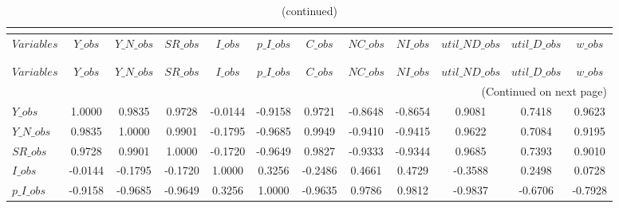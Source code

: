  
\begin{center}
\begin{longtable}{lccccccccccc} 
\caption{MATRIX OF CORRELATIONS}\\
 \label{Table:th_corr_matrix}\\
\toprule 
$Variables      $	 & 	 $          Y\_obs$	 & 	 $      Y\_N\_obs$	 & 	 $         SR\_obs$	 & 	 $          I\_obs$	 & 	 $      p\_I\_obs$	 & 	 $          C\_obs$	 & 	 $         NC\_obs$	 & 	 $         NI\_obs$	 & 	 $  util\_ND\_obs$	 & 	 $   util\_D\_obs$	 & 	 $          w\_obs$\\
\midrule \endfirsthead 
\caption{(continued)}\\
 \toprule \\ 
$Variables      $	 & 	 $          Y\_obs$	 & 	 $      Y\_N\_obs$	 & 	 $         SR\_obs$	 & 	 $          I\_obs$	 & 	 $      p\_I\_obs$	 & 	 $          C\_obs$	 & 	 $         NC\_obs$	 & 	 $         NI\_obs$	 & 	 $  util\_ND\_obs$	 & 	 $   util\_D\_obs$	 & 	 $          w\_obs$\\
\midrule \endhead 
\midrule \multicolumn{12}{r}{(Continued on next page)} \\ \bottomrule \endfoot 
\bottomrule \endlastfoot 
$Y\_obs         $	 & 	           1.0000	 & 	           0.9835	 & 	           0.9728	 & 	          -0.0144	 & 	          -0.9158	 & 	           0.9721	 & 	          -0.8648	 & 	          -0.8654	 & 	           0.9081	 & 	           0.7418	 & 	           0.9623 \\ 
$Y\_N\_obs      $	 & 	           0.9835	 & 	           1.0000	 & 	           0.9901	 & 	          -0.1795	 & 	          -0.9685	 & 	           0.9949	 & 	          -0.9410	 & 	          -0.9415	 & 	           0.9622	 & 	           0.7084	 & 	           0.9195 \\ 
$SR\_obs        $	 & 	           0.9728	 & 	           0.9901	 & 	           1.0000	 & 	          -0.1720	 & 	          -0.9649	 & 	           0.9827	 & 	          -0.9333	 & 	          -0.9344	 & 	           0.9685	 & 	           0.7393	 & 	           0.9010 \\ 
$I\_obs         $	 & 	          -0.0144	 & 	          -0.1795	 & 	          -0.1720	 & 	           1.0000	 & 	           0.3256	 & 	          -0.2486	 & 	           0.4661	 & 	           0.4729	 & 	          -0.3588	 & 	           0.2498	 & 	           0.0728 \\ 
$p\_I\_obs      $	 & 	          -0.9158	 & 	          -0.9685	 & 	          -0.9649	 & 	           0.3256	 & 	           1.0000	 & 	          -0.9635	 & 	           0.9786	 & 	           0.9812	 & 	          -0.9837	 & 	          -0.6706	 & 	          -0.7928 \\ 

\end{longtable}
\end{center}
